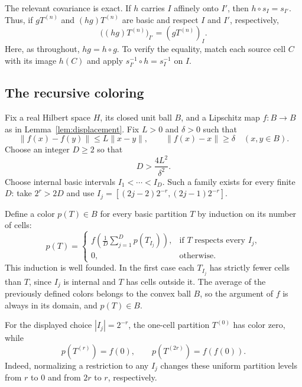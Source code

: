 \documentclass[11pt]{article}
\newcommand{\norm}[1]{\lVert #1\rVert}
\theoremstyle{definition}
\numberwithin{equation}{section}
\begin{document}
The relevant covariance is exact.  If $h$ carries $I$ affinely onto
$I'$, then $h\circ s_I=s_{I'}$.  Thus, if $gT^{(n)}$ and
$(hg)T^{(n)}$ are basic and respect $I$ and $I'$, respectively,
\begin{equation}\label{dyad:covariance}
  \bigl((hg)T^{(n)}\bigr)_{I'}=(gT^{(n)})_I.
\end{equation}
Here, as throughout, $hg=h\circ g$.  To verify the equality, match
each source cell $C$ with its image $h(C)$ and apply
$s_{I'}^{-1}\circ h=s_I^{-1}$ on $I$.

\subsection{The recursive coloring}\label{sec:coloring}

Fix a real Hilbert space $H$, its closed unit ball $B$, and a
Lipschitz map $f:B\to B$ as in Lemma~\ref{lem:displacement}.  Fix
$L>0$ and $\delta>0$ such that
\begin{equation}\label{color:map}
  \norm{f(x)-f(y)}\leq L\norm{x-y},\qquad
  \norm{f(x)-x}\geq\delta
  \quad(x,y\in B).
\end{equation}
Choose an integer $D\geq2$ so that
\begin{equation}\label{color:parameters}
  D>\frac{4L^2}{\delta^2}.
\end{equation}
Choose internal basic intervals $I_1<\cdots<I_D$.  Such a family
exists for every finite $D$: take $2^r>2D$ and use
$I_j=[(2j-2)2^{-r},(2j-1)2^{-r}]$.

Define a color $p(T)\in B$ for every basic partition $T$ by induction
on its number of cells:
\begin{equation}\label{color:recursion}
  p(T)=
  \begin{cases}
  \displaystyle f\left(\frac1D\sum_{j=1}^D p(T_{I_j})\right),
       &\text{if $T$ respects every $I_j$},\\[6pt]
  0,   &\text{otherwise}.
  \end{cases}
\end{equation}
This induction is well founded.  In the first case each $T_{I_j}$
has strictly fewer cells than $T$, since $I_j$ is internal and $T$
has cells outside it.  The average of the previously defined
colors belongs to the convex ball $B$, so the argument of $f$ is
always in its domain, and $p(T)\in B$.

For the displayed choice $|I_j|=2^{-r}$, the one-cell partition
$T^{(0)}$ has color zero, while
\[
  p(T^{(r)})=f(0),\qquad
  p(T^{(2r)})=f(f(0)).
\]
Indeed, normalizing a restriction to any $I_j$ changes these uniform
partition levels from $r$ to $0$ and from $2r$ to $r$, respectively.
\end{document}
